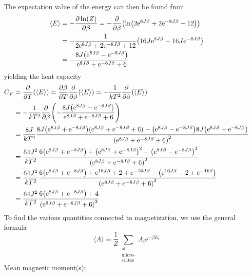 \documentclass[12pt,english,a4paper]{article}
\renewcommand{\exp}[1]{\mathrm{e}^{#1}}
\begin{document}
    The expectation value of the energy can then be found from
    \begin{alignat*}{2}
        \langle E\rangle &= -\pdv{\ln(Z)}{\beta} = -\pdv{\beta}(\ln(2\exp{8J\beta} + 2\exp{-8J\beta} + 12))\\
        &= -\frac{1}{2\exp{8J\beta} + 2\exp{-8J\beta} + 12}\qty(16J\exp{8J\beta}-16J\exp{-8J\beta})\\
        &= -\frac{8J\qty(\exp{8J\beta}-\exp{-8J\beta})}{\exp{8J\beta}+\exp{-8J\beta}+6}
    \end{alignat*}
    yielding the heat capacity
    \begin{alignat*}{2}
        C_V &= \pdv{T}(\langle E\rangle) = \pdv{\beta}{T}\pdv{\beta}(\langle E\rangle)=-\frac{1}{kT^2}\pdv{\beta}(\langle E\rangle)\\
        &= -\frac{1}{kT^2}\pdv{\beta}(-\frac{8J\qty(\exp{8J\beta}-\exp{-8J\beta})}{\exp{8J\beta}+\exp{-8J\beta}+6})\\
        &= \frac{8J}{kT^2}\frac{8J\qty(\exp{8J\beta}+\exp{-8J\beta})(\exp{8J\beta}+\exp{-8J\beta}+6)-\qty(\exp{8J\beta}-\exp{-8J\beta})8J\qty(\exp{8J\beta}-\exp{-8J\beta})}{\qty(\exp{8J\beta}+\exp{-8J\beta}+6)^2}\\
        &= \frac{64J^2}{kT^2}\frac{6\qty(\exp{8J\beta}+\exp{-8J\beta})+\qty(\exp{8J\beta}+\exp{-8J\beta})^2-\qty(\exp{8J\beta}-\exp{-8J\beta})^2}{\qty(\exp{8J\beta}+\exp{-8J\beta}+6)^2}\\
        &= \frac{64J^2}{kT^2}\frac{6\qty(\exp{8J\beta}+\exp{-8J\beta})+\exp{16J\beta}+2+\exp{-16J\beta}-\qty(\exp{16J\beta}-2+\exp{-16\beta})}{\qty(\exp{8J\beta}+\exp{-8J\beta}+6)^2}\\
        &= \frac{64J^2}{kT^2}\frac{6\qty(\exp{8J\beta}+\exp{-8J\beta})+4}{\qty(\exp{8J\beta}+\exp{-8J\beta}+6)^2}
    \end{alignat*}
    To find the various quantities connected to magnetization, we use the general formula
    \[
        \langle A\rangle = \frac{1}{Z}\sum_{\substack{\text{all}\\ \text{micro-}\\ \text{states}}}A_i\exp{-\beta E_i}
    \]
    Mean magnetic moment(s):
\end{document}
